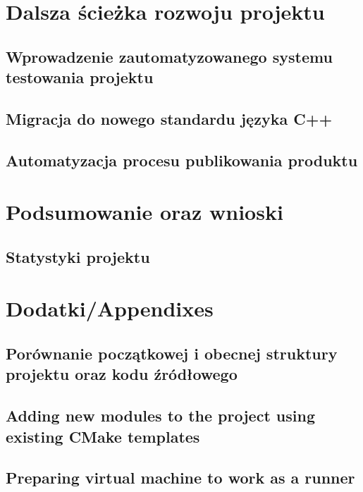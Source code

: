 \chapter{Dalsza ścieżka rozwoju projektu}
\label{cha:dalsze}

\section{Wprowadzenie zautomatyzowanego systemu testowania projektu}
\section{Migracja do nowego standardu języka C++}
\section{Automatyzacja procesu publikowania produktu}


\chapter{Podsumowanie oraz wnioski}
\label{cha:summary}

\section{Statystyki projektu}
\label{sec:stat}

\appendix
\chapter{Dodatki/Appendixes}
\label{cha:app}

\section{Porównanie początkowej i obecnej struktury projektu oraz kodu źródłowego}
\section{Adding new modules to the project using existing CMake templates}
\label{appendix:A2}

\section{Preparing virtual machine to work as a runner}
\label{appendix:A3}